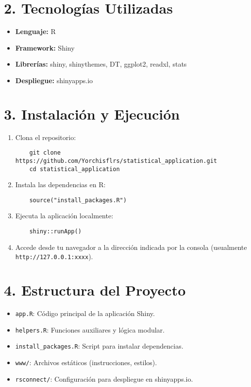 \documentclass[12pt]{article}
\begin{document}
\section*{2. Tecnologías Utilizadas}
\begin{itemize}
    \item \textbf{Lenguaje:} R
    \item \textbf{Framework:} Shiny
    \item \textbf{Librerías:} shiny, shinythemes, DT, ggplot2, readxl, stats
    \item \textbf{Despliegue:} shinyapps.io
\end{itemize}

\section*{3. Instalación y Ejecución}
\begin{enumerate}
    \item Clona el repositorio:
    \begin{verbatim}
    git clone https://github.com/Yorchisflrs/statistical_application.git
    cd statistical_application
    \end{verbatim}
    \item Instala las dependencias en R:
    \begin{verbatim}
    source("install_packages.R")
    \end{verbatim}
    \item Ejecuta la aplicación localmente:
    \begin{verbatim}
    shiny::runApp()
    \end{verbatim}
    \item Accede desde tu navegador a la dirección indicada por la consola (usualmente \texttt{http://127.0.0.1:xxxx}).
\end{enumerate}

\section*{4. Estructura del Proyecto}
\begin{itemize}
    \item \texttt{app.R}: Código principal de la aplicación Shiny.
    \item \texttt{helpers.R}: Funciones auxiliares y lógica modular.
    \item \texttt{install\_packages.R}: Script para instalar dependencias.
    \item \texttt{www/}: Archivos estáticos (instrucciones, estilos).
    \item \texttt{rsconnect/}: Configuración para despliegue en shinyapps.io.
\end{itemize}
\end{document}
